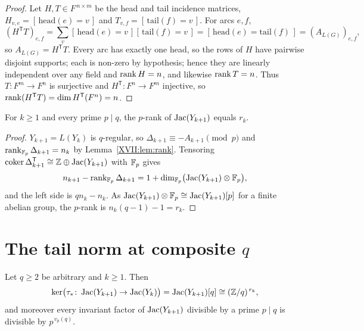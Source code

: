 \begin{proof}
Let $H,T\in F^{\,n\times m}$ be the head and tail incidence matrices,
$H_{v,e}=[\,\mathrm{head}(e)=v\,]$ and $T_{v,f}=[\,\mathrm{tail}(f)=v\,]$. For arcs $e,f$,
\[
(H^{\mathsf T}T)_{e,f}=\sum_{v}[\,\mathrm{head}(e)=v\,][\,\mathrm{tail}(f)=v\,]
=[\,\mathrm{head}(e)=\mathrm{tail}(f)\,]=(A_{L(G)})_{e,f},
\]
so $A_{L(G)}=H^{\mathsf T}T$. Every arc has exactly one head, so the rows of $H$ have
pairwise disjoint supports; each is non-zero by hypothesis; hence they are linearly
independent over any field and $\operatorname{rank} H=n$, and likewise $\operatorname{rank} T=n$. Thus
$T\colon F^m\to F^n$ is surjective and $H^{\mathsf T}\colon F^n\to F^m$ injective, so
$\operatorname{rank}(H^{\mathsf T}T)=\dim H^{\mathsf T}(F^n)=n$.
\end{proof}

\begin{corollary}\label{XVII:cor:prank}
For $k\ge1$ and every prime $p\mid q$, the $p$-rank of $\operatorname{Jac}(Y_{k+1})$ equals $r_k$.
\end{corollary}

\begin{proof}
$Y_{k+1}=L(Y_k)$ is $q$-regular, so $\Delta_{k+1}\equiv-A_{k+1}\pmod p$ and
$\operatorname{rank}_{\mathbb{F}_p}\Delta_{k+1}=n_k$ by Lemma~\ref{XVII:lem:rank}. Tensoring
$\operatorname{coker}\Delta_{k+1}^{\mathsf T}\cong\mathbb{Z}\oplus\operatorname{Jac}(Y_{k+1})$ with $\mathbb{F}_p$ gives
\[
n_{k+1}-\operatorname{rank}_{\mathbb{F}_p}\Delta_{k+1}=1+\dim_{\mathbb{F}_p}\bigl(\operatorname{Jac}(Y_{k+1})\otimes\mathbb{F}_p\bigr),
\]
and the left side is $qn_k-n_k$. As $\operatorname{Jac}(Y_{k+1})\otimes\mathbb{F}_p\cong\operatorname{Jac}(Y_{k+1})[p]$ for a
finite abelian group, the $p$-rank is $n_k(q-1)-1=r_k$.
\end{proof}

\section{The tail norm at composite \texorpdfstring{$q$}{q}}\label{XVII:sec:kernel}

\begin{theorem}\label{XVII:thm:main}
Let $q\ge2$ be arbitrary and $k\ge1$. Then
\[
\ker\bigl(\tau_*\colon\operatorname{Jac}(Y_{k+1})\to\operatorname{Jac}(Y_k)\bigr)=\operatorname{Jac}(Y_{k+1})[q]\cong(\mathbb{Z}/q)^{\,r_k},
\]
and moreover every invariant factor of $\operatorname{Jac}(Y_{k+1})$ divisible by a prime $p\mid q$ is
divisible by $p^{\,v_p(q)}$.
\end{theorem}

